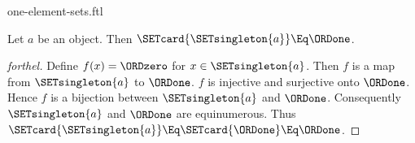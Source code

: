 \documentclass{stex}
\begin{document}
\begin{smodule}{one-element-sets.ftl}

\begin{proposition}[forthel]
  Let $a$ be an object.
  Then $\SETcard{\SETsingleton{a}} \Eq \ORDone$.
\end{proposition}
\begin{proof}[forthel]
  Define $f(x) = \ORDzero$ for $x \in \SETsingleton{a}$.
  Then $f$ is a map from $\SETsingleton{a}$ to $\ORDone$.
  $f$ is injective and surjective onto $\ORDone$.
  Hence $f$ is a bijection between $\SETsingleton{a}$ and $\ORDone$.
  Consequently $\SETsingleton{a}$ and $\ORDone$ are equinumerous.
  Thus $\SETcard{\SETsingleton{a}} \Eq \SETcard{\ORDone} \Eq \ORDone$.
\end{proof}
\end{smodule}
\end{document}

